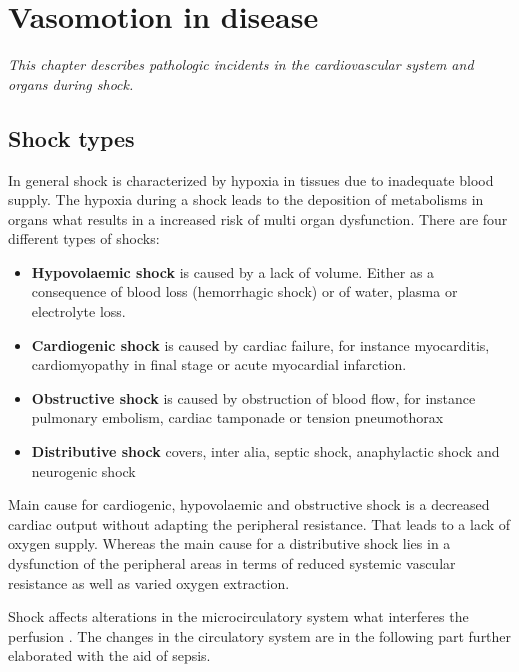\chapter{Vasomotion in disease}
\textit{This chapter describes pathologic incidents in the cardiovascular system and organs during shock.}

\section{Shock types}
In general shock is characterized by hypoxia in tissues due to inadequate blood supply. The hypoxia during a shock leads to the deposition of metabolisms in organs what results in a increased risk of multi organ dysfunction. 
There are four different types of shocks: \cite{lauridsen2015,vincent2013}
\begin{itemize}
	\item \textbf{Hypovolaemic shock} is caused by a lack of volume. Either as a consequence of blood loss (hemorrhagic shock) or of water, plasma or electrolyte loss.
	\item \textbf{Cardiogenic shock} is caused by cardiac failure, for instance myocarditis, cardiomyopathy in final stage or acute myocardial infarction.
	\item \textbf{Obstructive shock} is caused by obstruction of blood flow, for instance pulmonary embolism, cardiac tamponade or tension pneumothorax 
	\item \textbf{Distributive shock} covers, inter alia, septic shock, anaphylactic shock and neurogenic shock
\end{itemize}

Main cause for cardiogenic, hypovolaemic and obstructive shock is a decreased cardiac output without adapting the peripheral resistance. That leads to a lack of oxygen supply.
Whereas the main cause for a distributive shock lies in a dysfunction of the peripheral areas in terms of reduced systemic vascular resistance as well as varied oxygen extraction. \cite{vincent2013}

Shock affects alterations in the microcirculatory system what interferes the perfusion \cite{maier2013}. The changes in the circulatory system are in the following part further elaborated with the aid of sepsis.